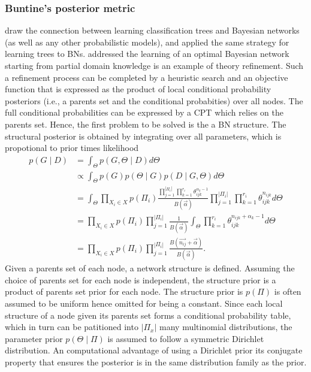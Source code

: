 \subsubsection{Buntine's posterior metric}
\cite{buntine1991classifiers} draw the connection between learning classification trees and Bayesian networks (as well as any other probabilistic models), and applied the same strategy for learning trees to BNs. \cite{buntine1991theory} addressed the learning of an optimal Bayesian network starting from partial domain knowledge is an example of theory refinement. Such a refinement process can be completed by a heuristic search and an objective function that is expressed as the product of local conditional probability posteriors (i.e., a parents set and the conditional probabities) over all nodes. The full conditional probabilities can be expressed by a CPT which relies on the parents set. Hence, the first problem to be solved is the a BN structure. The structural posterior is obtained by integrating over all parameters, which is propotional to prior times likelihood
\begin{align}
\label{eq:buntine91}
p(G \mid D) &= \int_{\Theta} p(G, \Theta \mid D) d\Theta \nonumber \\
&\propto \int_{\Theta} p(G) p(\Theta \mid G) p(D \mid G, \Theta) d\Theta \nonumber \\
&= \int_{\Theta} \prod_{X_i \in X} p(\Pi_i) \frac{\prod_{j=1}^{|\Pi_i|} \prod_{k=1}^{r_i} \theta_{ijk}^{\alpha_k-1}}{B(\vec{\alpha})} \prod_{j=1}^{|\Pi_i|} \prod_{k=1}^{r_i} \theta_{ijk}^{n_{ijk}} d\Theta \nonumber \\
&= \prod_{X_i \in X} p(\Pi_i) \prod_{j=1}^{|\Pi_i|} \frac{1}{B(\vec{\alpha})} \int_{\Theta} \prod_{k=1}^{r_i} \theta_{ijk}^{n_{ijk} + \alpha_k - 1} d\Theta \nonumber \\
&= \prod_{X_i \in X} p(\Pi_i) \prod_{j=1}^{|\Pi_i|} \frac{B(\vec{n_{ij}} + \vec{\alpha})}{B(\vec{\alpha})}.
\end{align}
Given a parents set of each node, a network structure is defined. Assuming the choice of parents set for each node is independent, the structure prior is a product of parents set prior for each node. The structure prior is $p(\Pi)$ is often assumed to be uniform hence omitted for being a constant. Since each local structure of a node given its parents set forms a conditional probability table, which in turn can be patitioned into $|\Pi_x|$ many multinomial distributions, the parameter prior $p(\Theta \mid \Pi)$ is assumed to follow a symmetric Dirichlet distribution. An computational advantage of using a Dirichlet prior its conjugate property that ensures the posterior is in the same distribution family as the prior. 

